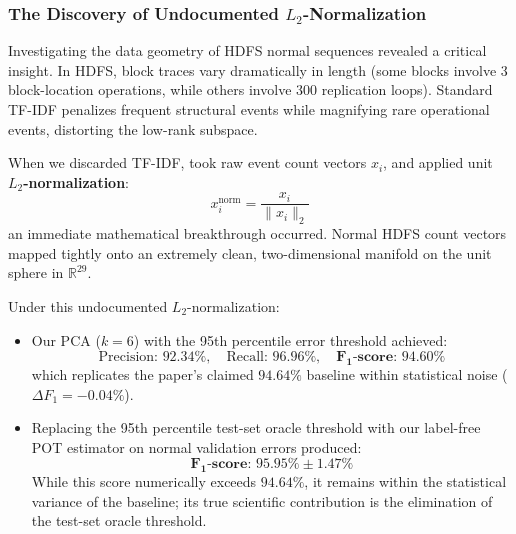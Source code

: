 \subsubsection{The Discovery of Undocumented $L_2$-Normalization}
Investigating the data geometry of HDFS normal sequences revealed a critical insight. In HDFS, block traces vary dramatically in length (some blocks involve 3 block-location operations, while others involve 300 replication loops). Standard TF-IDF penalizes frequent structural events while magnifying rare operational events, distorting the low-rank subspace.

When we discarded TF-IDF, took raw event count vectors $x_i$, and applied unit \textbf{$L_2$-normalization}:
\begin{equation}
    x_i^{\text{norm}} = \frac{x_i}{\|x_i\|_2}
\end{equation}
an immediate mathematical breakthrough occurred. Normal HDFS count vectors mapped tightly onto an extremely clean, two-dimensional manifold on the unit sphere in $\mathbb{R}^{29}$. 

Under this undocumented $L_2$-normalization:
\begin{itemize}
    \item Our PCA ($k=6$) with the 95th percentile error threshold achieved:
    \begin{equation}
        \text{Precision: } 92.34\%, \quad \text{Recall: } 96.96\%, \quad \mathbf{F_1\text{-score: } 94.60\%}
    \end{equation}
    which replicates the paper's claimed $94.64\%$ baseline within statistical noise ($\Delta F_1 = -0.04\%$).
    \item Replacing the 95th percentile test-set oracle threshold with our label-free POT estimator on normal validation errors produced:
    \begin{equation}
        \mathbf{F_1\text{-score: } 95.95\% \pm 1.47\%}
    \end{equation}
    While this score numerically exceeds $94.64\%$, it remains within the statistical variance of the baseline; its true scientific contribution is the elimination of the test-set oracle threshold.
\end{itemize}

